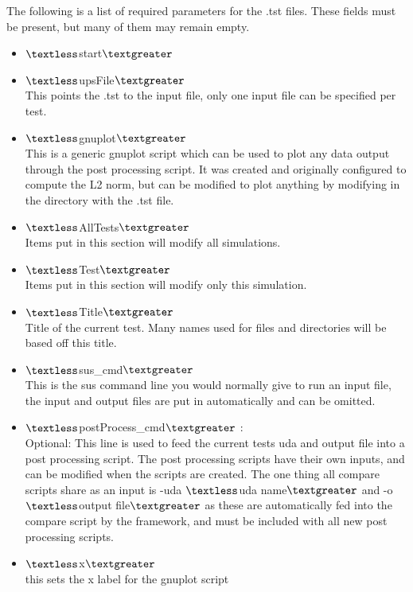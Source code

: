 The following is a list of required parameters for the .tst files. These fields must be present, but many of them may remain empty.
\begin{itemize}
\item $\textless$start$\textgreater$
\item $\textless$upsFile$\textgreater$ \\
This points the .tst to the input file, only one input file can be specified per test.
\item $\textless$gnuplot$\textgreater$ \\
This is a generic gnuplot script which can be used to plot any data output through the post processing script. It was created and originally configured to compute the L2 norm, but can be modified to plot anything by modifying  in the directory with the .tst file.
\item $\textless$AllTests$\textgreater$ \\
Items put in this section will modify all simulations.
\item $\textless$Test$\textgreater$ \\
Items put in this section will modify only this simulation.
\item $\textless$Title$\textgreater$ \\
Title of the current test. Many names used for files and directories will be based off this title.
\item $\textless$sus\_cmd$\textgreater$ \\
This is the sus command line you would normally give to run an input file, the input and output files are put in automatically and can be omitted.
\item $\textless$postProcess\_cmd$\textgreater$ : \\
Optional:  This line is used to feed the current tests uda and output file into a post processing script. The post processing scripts have their own inputs, and can be modified when the scripts are created. The one thing all compare scripts share as an input is -uda $\textless$uda name$\textgreater$ and -o $\textless$output file$\textgreater$ as these are automatically fed into the compare script by the framework, and must be included with all new post processing scripts.
\item $\textless$x$\textgreater$\\
this sets the x label for the gnuplot script
\end{itemize}

